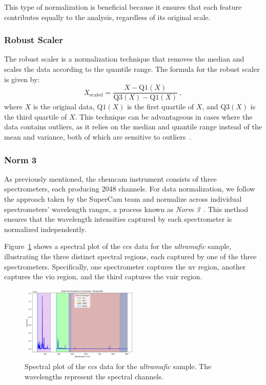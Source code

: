 This type of normalization is beneficial because it ensures that each feature contributes equally to the analysis, regardless of its original scale.

\subsubsection{Robust Scaler}
The robust scaler is a normalization technique that removes the median and scales the data according to the quantile range.
The formula for the robust scaler is given by:
$$
X_{\text{scaled}} = \frac{X - \text{Q1}(X)}{\text{Q3}(X) - \text{Q1}(X)} \: ,
$$
where $X$ is the original data, $\text{Q1}(X)$ is the first quartile of $X$, and $\text{Q3}(X)$ is the third quartile of $X$.
This technique can be advantageous in cases where the data contains outliers, as it relies on the median and quantile range instead of the mean and variance, both of which are sensitive to outliers~\cite{Vasques2024}.

\subsubsection{Norm 3}
As previously mentioned, the \gls{chemcam} instrument consists of three spectrometers, each producing 2048 channels.
For data normalization, we follow the approach taken by the SuperCam team and normalize across individual spectrometers' wavelength ranges, a process known as \textit{Norm 3}~\cite{andersonPostlandingMajorElement2022}.
This method ensures that the wavelength intensities captured by each spectrometer is normalized independently.

Figure~\ref{fig:spectral_plot} shows a spectral plot of the \gls{ccs} data for the \textit{ultramafic} sample, illustrating the three distinct spectral regions, each captured by one of the three spectrometers. Specifically, one spectrometer captures the \gls{uv} region, another captures the \gls{vio} region, and the third captures the \gls{vnir} region.

\begin{figure}[H]
	\centering
	\includegraphics[width=0.5\textwidth]{images/spectral_plot.png}
	\caption{Spectral plot of the \gls{ccs} data for the \textit{ultramafic} sample. The wavelengths represent the spectral channels.}
	\label{fig:spectral_plot}
\end{figure}

